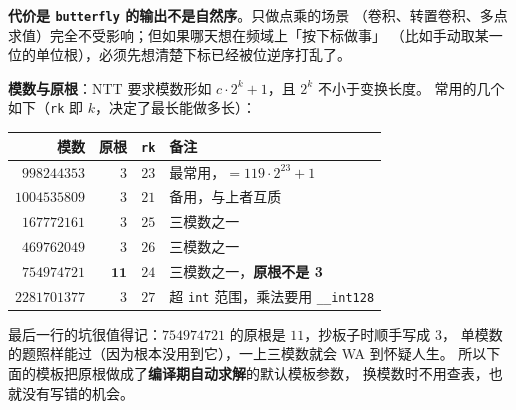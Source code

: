 		\textbf{代价是 \texttt{butterfly} 的输出不是自然序}。只做点乘的场景
		（卷积、转置卷积、多点求值）完全不受影响；但如果哪天想在频域上「按下标做事」
		（比如手动取某一位的单位根），必须先想清楚下标已经被位逆序打乱了。

		\textbf{模数与原根}：NTT 要求模数形如 $c \cdot 2^k + 1$，且 $2^k$ 不小于变换长度。
		常用的几个如下（\texttt{rk} 即 $k$，决定了最长能做多长）：

		\begin{center}
		\begin{tabular}{rrrl}
			\hline
			模数 & 原根 & \texttt{rk} & 备注 \\
			\hline
			$998244353$   & $3$  & $23$ & 最常用，$= 119 \cdot 2^{23} + 1$ \\
			$1004535809   $ & $3$  & $21$ & 备用，与上者互质 \\
			$167772161$   & $3$  & $25$ & 三模数之一 \\
			$469762049$   & $3$  & $26$ & 三模数之一 \\
			$754974721$   & $\mathbf{11}$ & $24$ & 三模数之一，\textbf{原根不是 3} \\
			$2281701377$  & $3$  & $27$ & 超 \texttt{int} 范围，乘法要用 \texttt{\_\_int128} \\
			\hline
		\end{tabular}
		\end{center}

		最后一行的坑很值得记：$754974721$ 的原根是 $11$，抄板子时顺手写成 $3$，
		单模数的题照样能过（因为根本没用到它），一上三模数就会 WA 到怀疑人生。
		所以下面的模板把原根做成了\textbf{编译期自动求解}的默认模板参数，
		换模数时不用查表，也就没有写错的机会。

